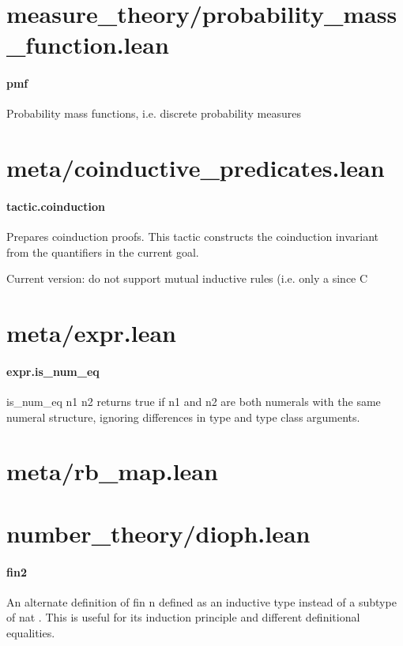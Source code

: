 \documentclass{article}
\begin{document}
\section{measure\_theory/probability\_mass\_function.lean}\paragraph{pmf}
\par
Probability mass functions, i.e. discrete probability measures
\section{meta/coinductive\_predicates.lean}\paragraph{tactic.coinduction}
\par
Prepares coinduction proofs. This tactic constructs the coinduction invariant from
the quantifiers in the current goal.
\par
Current version: do not support mutual inductive rules (i.e. only a since C
\section{meta/expr.lean}\paragraph{expr.is\_num\_eq}
\par
is\_num\_eq n1 n2 returns true if n1 and n2 are both numerals with the same numeral structure,
ignoring differences in type and type class arguments.
\section{meta/rb\_map.lean}\section{number\_theory/dioph.lean}\paragraph{fin2}
\par
An alternate definition of 
\colorbox[RGB]{253,246,227}{{{{\color[RGB]{101, 123, 131} fin n }}}} defined as an inductive type
instead of a subtype of 
\colorbox[RGB]{253,246,227}{{{{\color[RGB]{101, 123, 131} nat }}}}. This is useful for its induction
principle and different definitional equalities.
\end{document}
